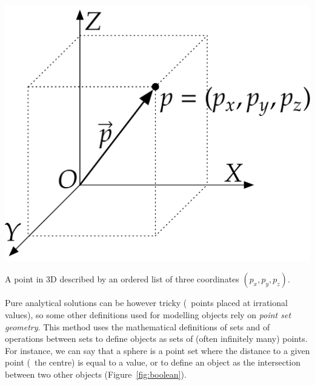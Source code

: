 \begin{description}
\begin{marginfigure}
\centering
\includegraphics[width=\linewidth]{figs/point.pdf}
\caption{A point in 3D described by an ordered list of three coordinates $(p_x,p_y,p_z)$.}%
\label{fig:point}
\end{marginfigure}

Pure analytical solutions can be however tricky (\eg\ points placed at irrational values), so some other definitions used for modelling objects rely on \emph{point set geometry}.
This method uses the mathematical definitions of sets and of operations between sets to define objects as sets of (often infinitely many) points.
For instance, we can say that a sphere is a point set where the distance to a given point (\ie\ the centre) is equal to a value, or to define an object as the intersection between two other objects (Figure~\ref{fig:boolean}).


\end{description}

